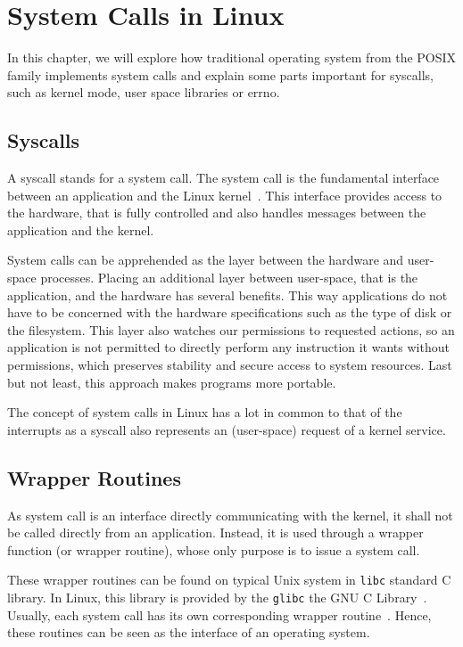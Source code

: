 \chapter{ System Calls in Linux } \label{chap:syscalls}

In this chapter, we will explore how traditional operating system from the POSIX family implements system calls and explain some parts important for syscalls, such as kernel mode, user space libraries or errno.

\section{ Syscalls } \label{sec:syscalls:syscalls}

A syscall stands for a system call. The system call is the fundamental interface between an application and the Linux kernel~\cite{Man_syscall}. This interface provides access to the hardware, that is fully controlled and also handles messages between the application and the kernel. 

System calls can be apprehended as the layer between the hardware and user-space processes. Placing an additional layer between user-space, that is the application, and the hardware has several benefits. This way applications do not have to be concerned with the hardware specifications such as the type of disk or the filesystem. This layer also watches our permissions to requested actions, so an application is not permitted to directly perform any instruction it wants without permissions, which preserves stability and secure access to system resources. Last but not least, this approach makes programs more portable.

The concept of system calls in Linux has a lot in common to that of the interrupts as a syscall also represents an (user-space) request of a kernel service. 

\section{ Wrapper Routines }

As system call is an interface directly communicating with the kernel, it shall not be called directly from an application. Instead, it is used through a wrapper function (or wrapper routine), whose only purpose is to issue a system call.

These wrapper routines can be found on typical Unix system in \texttt{libc} \- standard C library. In Linux, this library is provided by the \texttt{glibc} \- the GNU C Library~\cite{glibc}. Usually, each system call has its own corresponding wrapper routine~\cite{LinuxKernel}. Hence, these routines can be seen as the interface of an operating system.

